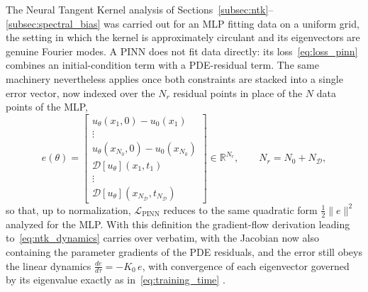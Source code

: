 The Neural Tangent Kernel analysis of Sections~\ref{subsec:ntk}--\ref{subsec:spectral_bias} was carried out for an MLP fitting data on a uniform grid, the setting in which the kernel is approximately circulant and its eigenvectors are genuine Fourier modes. A PINN does not fit data directly: its loss~\eqref{eq:loss_pinn} combines an initial-condition term with a PDE-residual term. The same machinery nevertheless applies once both constraints are stacked into a single error vector, now indexed over the $N_r$ residual points in place of the $N$ data points of the MLP,
\begin{equation}\label{eq:pinn_error_vector}
    e(\theta) =
    \begin{bmatrix}
        u_\theta(x_1,0) - u_0(x_1) \\ \vdots \\ u_\theta(x_{N_0},0) - u_0(x_{N_0}) \\[3pt]
        \mathcal{D}[u_\theta](x_1,t_1) \\ \vdots \\ \mathcal{D}[u_\theta](x_{N_\mathcal{D}},t_{N_\mathcal{D}})
    \end{bmatrix}
    \in \mathbb{R}^{N_r}, \qquad N_r = N_0 + N_\mathcal{D},
\end{equation}
so that, up to normalization, $\mathcal{L}_{\text{PINN}}$ reduces to the same quadratic form $\tfrac{1}{2}\|e\|^2$ analyzed for the MLP. With this definition the gradient-flow derivation leading to~\eqref{eq:ntk_dynamics} carries over verbatim, with the Jacobian now also containing the parameter gradients of the PDE residuals, and the error still obeys the linear dynamics $\frac{de}{d\tau} = -K_0\,e$, with convergence of each eigenvector governed by its eigenvalue exactly as in~\eqref{eq:training_time} \parencite{wang2022ntk}.

